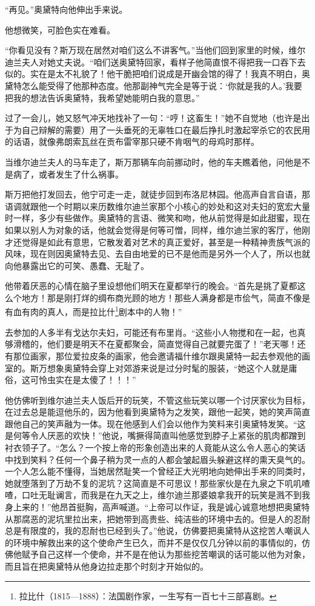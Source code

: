 \par “再见。”奥黛特向他伸出手来说。
\par 他想微笑，可脸色实在难看。
\par “你看见没有？斯万现在居然对咱们这么不讲客气。”当他们回到家里的时候，维尔迪兰夫人对她丈夫说。“咱们送奥黛特回家，看样子他简直恨不得把我一口吞下去似的。实在是太不礼貌了！他干脆把咱们说成是开幽会馆的得了！我真不明白，奥黛特怎么能受得了他那种态度。他那副神气完全是等于说：‘你就是我的人。’我要把我的想法告诉奥黛特，我希望她能明白我的意思。”
\par 过了一会儿，她又怒气冲天地找补了一句：“哼！这畜生！”她不自觉地（也许是出于为自己辩解的需要）用了一头垂死的无辜牲口在最后挣扎时激起宰杀它的农民用的话语，就像弗朗索瓦丝在贡布雷宰那只硬不肯咽气的母鸡时那样。
\par 当维尔迪兰夫人的马车走了，斯万那辆车向前挪动时，他的车夫瞧着他，问他是不是病了，或者发生了什么祸事。
\par 斯万把他打发回去，他宁可走一走，就徒步回到布洛尼林园。他高声自言自语，那语调就跟他一个时期以来历数维尔迪兰家那个小核心的妙处和这对夫妇的宽宏大量时一样，多少有些做作。奥黛特的言语、微笑和吻，他从前觉得是如此甜蜜，现在如果以别人为对象的话，他就会觉得是何等可憎，同样，维尔迪兰家的客厅，他刚才还觉得是如此有意思，它散发着对艺术的真正爱好，甚至是一种精神贵族气派的风味，现在则因奥黛特去见、去自由地爱的已不是他而是另外一个人了，所以也就向他暴露出它的可笑、愚蠢、无耻了。
\par 他带着厌恶的心情在脑子里设想他们明天在夏都举行的晚会。“首先是挑了夏都这么个地方！那是刚打烊的绸布商光顾的地方！那些人满身都是市侩气，简直不像是有血有肉的真人，而是拉比什\footnote{拉比什（1815—1888）：法国剧作家，一生写有一百七十三部喜剧。}剧本中的人物！”
\par 去参加的人多半有戈达尔夫妇，可能还有布里肖。“这些小人物搅和在一起，也真够滑稽的，他们要是明天不在夏都聚会，简直觉得自己就要完蛋了！”老天哪！还有那位画家，那位爱拉皮条的画家，他会邀请福什维尔跟奥黛特一起去参观他的画室的。斯万想象奥黛特会穿上对郊游来说是过分时髦的服装，“她这个人就是庸俗，这可怜虫实在是太傻了！！！”
\par 他仿佛听到维尔迪兰夫人饭后开的玩笑，不管这些玩笑以哪一个讨厌家伙为目标，在过去总是能逗他乐的，因为他看到奥黛特为之发笑，跟他一起笑，她的笑声简直跟他自己的笑声融为一体。现在他感到人们会以他作为笑料来引奥黛特发笑。“这是何等令人厌恶的欢快！”他说，嘴撅得简直叫他感觉到脖子上紧张的肌肉都蹭到衬衣领子了。“怎么？一个按上帝的形象创造出来的人竟能从这么令人恶心的笑话中找到笑料？任何一个鼻子稍为灵一点的人都会皱起眉头躲避这样的熏天臭气的。一个人怎么能不懂得，当她居然耻笑一个曾经正大光明地向她伸出手来的同类时，她就堕落到了万劫不复的泥坑？这简直是不可思议！那些家伙是在九泉之下叽叽喳喳，口吐无耻谰言，而我是在九天之上，维尔迪兰那婆娘拿我开的玩笑是溅不到我身上来的！”他昂首挺胸，高声喊道。“上帝可以作证，我是诚心诚意地想把奥黛特从那腐恶的泥坑里拉出来，把她带到高贵些、纯洁些的环境中去的。但是人的忍耐总是有限度的，我的忍耐也已经到头了。”他说，仿佛要把奥黛特从这挖苦人嘲讽人的环境中解救出来的这个使命产生已久，而并不是仅仅几分钟以前的事情似的，仿佛他赋予自己这样一个使命，并不是在他认为那些挖苦嘲讽的话可能以他为对象，而且旨在把奥黛特从他身边拉走那个时刻才开始似的。
